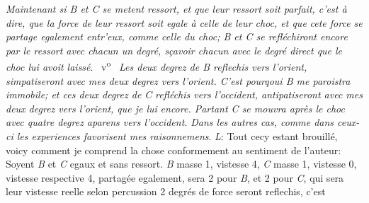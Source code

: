 %
\pend
%
\pstart \textit{Maintenant si \textit{B} et \textit{C} se metent}
%
%
\textit{ressort,\protect{} et que leur ressort soit parfait,\protect{} c'est à dire, que la force de leur ressort soit egale à celle
%
de leur choc, et que} 
%
\textit{cete force\protect{} se partage egalement entr'eux, comme celle du choc; \textit{B} et \textit{C} se refléchiront encore 
%
par le ressort\protect{} avec chacun un degré, sçavoir chacun avec le degré direct que le choc lui avoit laissé}. 
%
~v\textsuperscript{o}\rbrack\ 
%
\textit{Les deux degrez de \textit{B} reflechis vers l'orient, simpatiseront avec mes deux degrez vers l'orient. 
%
C'est pourqoui \textit{B} me paroistra immobile; et ces deux degrez de \textit{C}}
%
\textit{refléchis vers l'occident, antipatiseront avec mes deux degrez vers l'orient, que je lui}
%
%
\textit{encore. Partant \textit{C} se mouvra après le choc avec quatre degrez aparens vers l'occident.} %
\pend
%
\pstart
\textit{Dans les autres cas, comme dans ceux-ci les experiences favorisent mes raisonnemens}. \pend
%
\vspace{0.5em} %
\pstart
\noindent
\lbrack\foreignlanguage{ngerman}{\textit{L}:}\rbrack
%
\pend
%
\pstart
{}
%
Tout cecy estant brouillé, voicy comment je comprend la chose 
%
conformement au sentiment de l'auteur: 
%
Soyent \textit{B} et \textit{C} egaux et sans ressort.\protect{} \textit{B} masse 1, vistesse 4, \textit{C} masse 1, vistesse 0,
%
vistesse respective\protect{} 4, partagée egalement, sera 2 pour \textit{B}, et 2 pour \textit{C}, qui sera leur vistesse reelle\protect{} selon
%
%
percussion\protect{} 
%
%
2 degrés de force seront reflechis, c'est 
